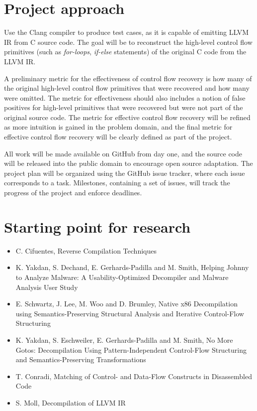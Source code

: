 \documentclass[12pt, a4paper]{article}
\begin{document}
\section{Project approach}

Use the Clang compiler to produce test cases, as it is capable of emitting LLVM IR from C source code. The goal will be to reconstruct the high-level control flow primitives (such as \textit{for-loops}, \textit{if-else} statements) of the original C code from the LLVM IR.

A preliminary metric for the effectiveness of control flow recovery is how many of the original high-level control flow primitives that were recovered and how many were omitted. The metric for effectiveness should also includes a notion of false positives for high-level primitives that were recovered but were not part of the original source code. The metric for effective control flow recovery will be refined as more intuition is gained in the problem domain, and the final metric for effective control flow recovery will be clearly defined as part of the project.

All work will be made available on GitHub from day one, and the source code will be released into the public domain to encourage open source adaptation. The project plan will be organized using the GitHub issue tracker, where each issue corresponds to a task. Milestones, containing a set of issues, will track the progress of the project and enforce deadlines.

\section{Starting point for research}

\begin{itemize}
	\item C. Cifuentes, Reverse Compilation Techniques \cite{cifuentes_reverse_comp}
	\item K. Yakdan, S. Dechand, E. Gerhards-Padilla and M. Smith, Helping Johnny to Analyze Malware: A Usability-Optimized Decompiler and Malware Analysis User Study \cite{helping_johnny}
	\item E. Schwartz, J. Lee, M. Woo and D. Brumley, Native x86 Decompilation using Semantics-Preserving Structural Analysis and Iterative Control-Flow Structuring \cite{semantics_preserving_structural_analysis}
	\item K. Yakdan, S. Eschweiler, E. Gerhards-Padilla and M. Smith, No More Gotos: Decompilation Using Pattern-Independent Control-Flow Structuring and Semantics-Preserving Transformations \cite{no_more_gotos}
	\item T. Conradi, Matching of Control- and Data-Flow Constructs in Disassembled Code \cite{pdg_control_flow_analysis}
	\item S. Moll, Decompilation of LLVM IR \cite{node_splitting}
\end{itemize}

\clearpage


\end{document}
